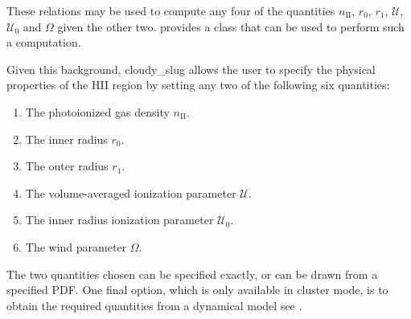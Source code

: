 \documentclass[letterpaper,10pt,english]{sphinxmanual}
\begin{document}
These relations may be used to compute any four of the quantities
\(n_{\mathrm{II}}\), \(r_0\), \(r_1\), \(\mathcal{U}\),
\(\mathcal{U}_0\) and \(\Omega\) given the other two.
{\hyperref[\detokenize{slugpy:sec-slugpy}]{}} provides a class  that can be used
to perform such a computation.

Given this background, cloudy\_slug allows the user to specify the
physical properties of the HII region by setting any two of the
following six quantities:
\begin{enumerate}
\item {} 
The photoionized gas density \(n_{\mathrm{II}}\).

\item {} 
The inner radius \(r_0\).

\item {} 
The outer radius \(r_1\).

\item {} 
The volume-averaged ionization parameter \(\mathcal{U}\).

\item {} 
The inner radius ionization parameter \(\mathcal{U}_0\).

\item {} 
The wind parameter \(\Omega\).

\end{enumerate}

The two quantities chosen can be specified exactly, or can be drawn
from a specified PDF. One final option, which is only available in
cluster mode, is to obtain the required quantities from a dynamical
model \textendash{} see {\hyperref[\detokenize{cloudy:sssec-cloudy-dynamical-cluster-mode}]{}}.
\end{document}
